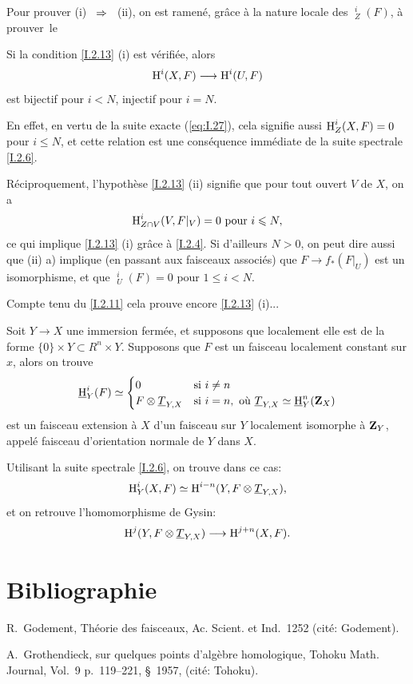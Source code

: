 Pour prouver (i) ~$\To$~ (ii), on est ramen\'e, gr\^ace \`a la nature locale des $\mathop{\underline{\mathrm{H}}}\nolimits_Z^i(F)$, \`a prouver~le

\begin{corollaire} \label{I.2.14}
Si la condition \ref{I.2.13} (i) est v\'erifi\'ee, alors
$$
\H^i(X, F) \to \H^i(U, F)$$
est bijectif pour $i<N$, injectif pour $i=N$.
\end{corollaire}

En effet, en vertu de la suite exacte (\ref{eq:I.27}), cela signifie aussi $\operatorname{H}^i_Z(X, F)=0$ pour $i\leq N$, et cette relation est une cons\'equence imm\'ediate de la suite spectrale \ref{I.2.6}.

R\'eciproquement, l'hypoth\`ese \ref{I.2.13} (ii) signifie que pour tout ouvert $V$ de $X$, on a
$$
\operatorname{H}^i_{Z\cap V}(V, F|_{V}) =0 \text{ pour } i\leqslant N,
$$
ce qui implique \ref{I.2.13} (i) gr\^ace \`a \ref{I.2.4}. Si d'ailleurs $N>0$, on peut dire aussi que (ii) a) implique (en passant aux faisceaux associ\'es) que $F \to f_*(F|_{U})$ est un isomorphisme, et que $\mathop{\underline{\mathrm{H}}}\nolimits_U^i(F)=0 $ pour $1\leq i<N$.

Compte tenu du \ref{I.2.11} cela prouve encore \ref{I.2.13} (i)...

\begin{remarquestar}
Soit $Y \to X$ une immersion ferm\'ee, et supposons que localement elle est de la forme $\{0\}\times Y \subset R^n \times Y$. Supposons que $F$ est un faisceau localement constant sur $x$, alors on trouve
\begin{equation} \label{eq:I.30}
\mathop{\underline{\mathrm{H}}}\nolimits_Y^i (F)\simeq
\begin{cases}
0 &\text{si } i \neq n\\
F\otimes \underline{T}_{Y, X}& \text{si } i=n, \text{ où } \underline{T}_{Y, X} \simeq \mathop{\underline{\mathrm{H}}}\nolimits_Y^n(\mathbf{Z}_X)
\end{cases}
\end{equation}
est un faisceau extension \`a $X$ d'un faisceau sur $Y$ localement isomorphe \`a $\mathbf{Z}_Y$, appel\'e \og faisceau d'orientation normale de $Y$ dans $X$\fg.
\end{remarquestar}

Utilisant la suite spectrale \ref{I.2.6}, on trouve dans ce cas:
\begin{equation} \label{eq:I.31}
\operatorname{H}^i_Y(X, F)\simeq \operatorname{H}^{i-n}(Y, F\otimes \underline{T}_{Y, X}),
\end{equation}
et on retrouve l'\og homomorphisme de Gysin\label{hgysin}\fg:
\begin{equation} \label{eq:I.32} {\H^j(Y, F\otimes \underline{T}_{Y, X}) \to \H^{j+n}(X, F)}.
\end{equation}

%
\section*{Bibliographie}
\noindent
R.\, Godement, Th\'eorie des faisceaux, Ac. Scient. et Ind.~1252 (cit\'e: Godement).
\par\smallskip\noindent
A.\, Grothendieck, sur quelques points d'alg\`ebre homologique, Tohoku Math. Journal, Vol.~9 p.\, 119--221, \S~1957, (cit\'e: Tohoku).


